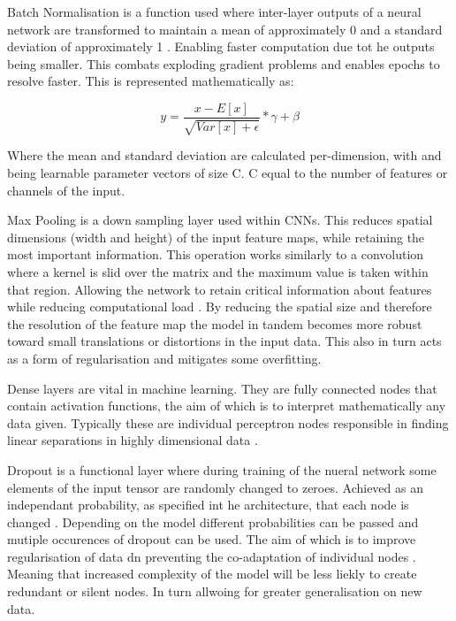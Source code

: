 \documentclass[10pt,twocolumn,letterpaper]{article}
\begin{document}
Batch Normalisation is a function used where inter-layer outputs of a neural network are transformed to maintain a mean of approximately 0 and a standard deviation of approximately 1 \cite{pytorch}. Enabling faster computation due tot he outputs being smaller. This combats exploding gradient problems and enables epochs to resolve faster. This is represented mathematically as:

\[y = \frac{x-E[x]}{\sqrt{Var[x]+\epsilon}} * \gamma + \beta\]

Where the mean and standard deviation are calculated per-dimension, with and being learnable parameter vectors of size C. C equal to the number of features or channels of the input. 

Max Pooling is a down sampling layer used within CNNs. This reduces spatial dimensions (width and height) of the input feature maps, while retaining the most important information. This operation works similarly to a convolution where a kernel is slid over the matrix and the maximum value is taken within that region. Allowing the network to retain critical information about features while reducing computational load \cite{recent_trends}. By reducing the spatial size and therefore the resolution of the feature map the model in tandem becomes more robust toward small translations or distortions in the input data. This also in turn acts as a form of regularisation and mitigates some overfitting. 

Dense layers are vital in machine learning. They are fully connected nodes that contain activation functions, the aim of which is to interpret mathematically any data given. Typically these are individual perceptron nodes responsible in finding linear separations in highly dimensional data \cite{pytorch}. 

Dropout is a functional layer where during training of the nueral network some elements of the input tensor are randomly changed to zeroes. Achieved as an independant probability, as specified int he architecture, that each node is changed \cite{pytorch}. Depending on the model different probabilities can be passed and mutiple occurences of dropout can be used. The aim of which is to improve regularisation of data dn preventing the co-adaptation of individual nodes \cite{hinton2012improvingneuralnetworkspreventing}. Meaning that increased complexity of the model will be less liekly to create redundant or silent nodes. In turn allwoing for greater generalisation on new data. 
\end{document}
